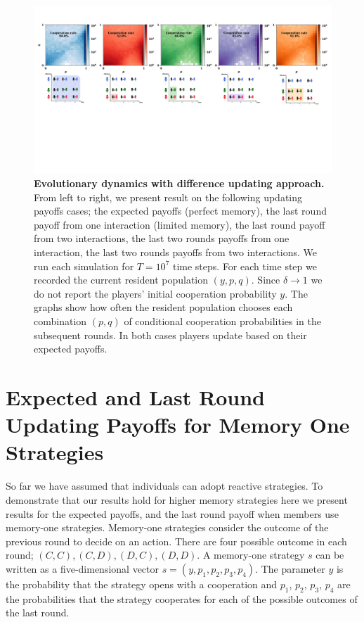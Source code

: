 \documentclass[11pt]{article}
\theoremstyle{plainCl1}
\theoremstyle{plainCl2}
\begin{document}
\begin{figure}[!htbp]
    \centering 
    \includegraphics[width=\textwidth]{static/more_memory_heatmaps_donation_game_with_illustrations.pdf}
    \caption{\textbf{Evolutionary dynamics with difference updating approach.}
    From left to right, we present result on the following updating payoffs
    cases; the expected payoffs (perfect memory), the last round payoff
    from one interaction (limited memory), the last round payoff from two
    interactions, the last two rounds payoffs from one interaction, the
    last two rounds payoffs from two interactions. We run each simulation for \(T
    = 10^7\) time steps. For each time step we recorded the current resident
    population \((y, p, q)\). Since \(\delta \rightarrow 1\) we do not report the
    players' initial cooperation probability \(y\). The graphs show how often the
    resident population chooses each combination \((p, q)\) of conditional
    cooperation probabilities in the subsequent rounds. In both cases players
    update based on their expected payoffs.}\label{fig:expected_payoffs_results}
\end{figure}

\section{Expected and Last Round Updating Payoffs for Memory One Strategies}\label{section:memory_one}

So far we have assumed that individuals can adopt reactive strategies.
To demonstrate that our results hold for higher memory strategies here we
present results for the expected payoffs, and the last round payoff when members
use memory-one strategies. Memory-one strategies consider the outcome of the
previous round to decide on an action. There are four possible outcome in each
round; \((C, C), (C, D), (D, C), (D, D)\). A memory-one strategy \(s\) can be
written as a five-dimensional vector \(s=(y, p_1, p_2, p_3, p_4)\). The
parameter \(y\) is the probability that the strategy opens with a cooperation
and \(p_1\), \(p_2\), \(p_3\), \(p_4\) are the probabilities that the strategy
cooperates for each of the possible outcomes of the last round.
\end{document}
